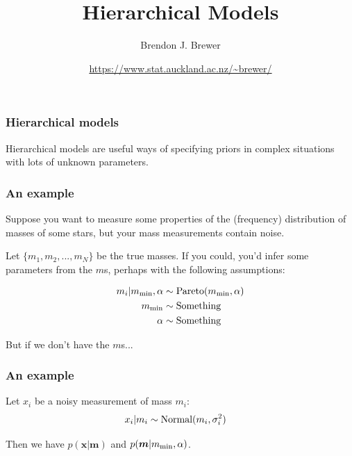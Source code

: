 \documentclass{beamer}
\title{Hierarchical Models}
\author{Brendon J. Brewer}
\institute{Department of Statistics\\
The University of Auckland}
\date{\color{blue}\url{https://www.stat.auckland.ac.nz/~brewer/}}
\begin{document}

\begin{frame}[t,plain]
\titlepage
\end{frame}


\begin{frame}[t,plain]
\frametitle{Hierarchical models}
\vspace{2em}
Hierarchical models are useful ways of specifying priors in complex situations
with lots of unknown parameters.

\end{frame}



\begin{frame}[t,plain]
\frametitle{An example}
Suppose you want to measure some properties of the (frequency) distribution of
masses of some stars, but your mass measurements contain noise.\vspace{1em}

Let $\{m_1, m_2, ..., m_N\}$ be the true masses. If you could, you'd infer
some parameters from the $m$s, perhaps with the following assumptions:

\begin{align}
m_i | m_{\rm min},\alpha &\sim \textnormal{Pareto}(m_{\rm min}, \alpha) \\
m_{\rm min} &\sim \textnormal{Something} \\
\alpha      &\sim \textnormal{Something}
\end{align}

But if we don't have the $m$s...

\end{frame}






\begin{frame}[t,plain]
\frametitle{An example}

Let $x_i$ be a noisy measurement of mass $m_i$:
\begin{align}
x_i | m_i &\sim \textnormal{Normal}(m_i, \sigma_i^2)
\end{align}

Then we have $p(\boldsymbol{x} | \boldsymbol{m})$ and
$p(\boldsymbol{m} | m_{\rm min}, \alpha)$.

\end{frame}
\end{document}
